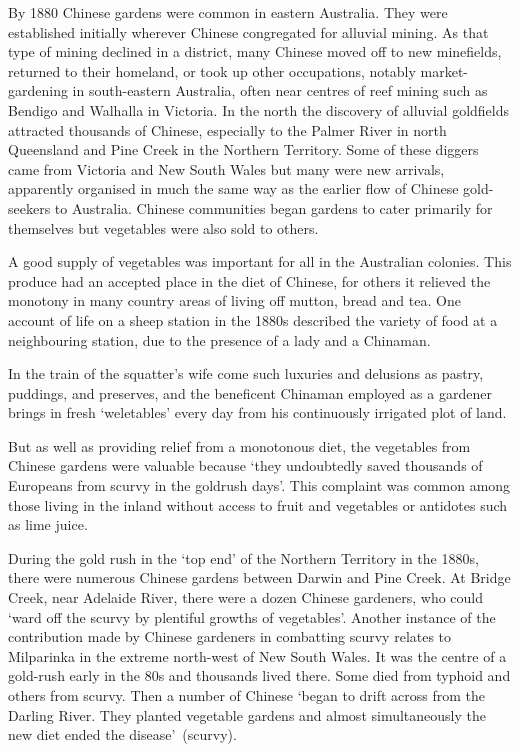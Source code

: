 By 1880 Chinese gardens were common in eastern Australia.  They were
established initially wherever Chinese congregated for alluvial
mining.  As that type of mining declined in a
district, many Chinese moved off to new minefields, returned to their
homeland, or took up other occupations, notably market-gardening in
south-eastern Austra\-lia, often near centres of reef mining
 such as Bendigo  and Walhalla
 in Victoria.  In the north the discovery of
alluvial goldfields attracted thousands of Chinese, especially to the
Palmer River in  north Queensland
 and Pine Creek  in the Northern
Territory.   Some of these diggers came from
Victoria and New South Wales but many were new arrivals, apparently
organised in much the same way as the earlier flow of Chinese
gold-seekers to Australia.  Chinese communities began gardens to cater
primarily for themselves but vegetables were also sold to others.

A good supply of vegetables was important for all in the Australian
colonies.  This produce had an accepted place in the diet of Chinese,
for others it relieved the monotony in many country areas of living
off mutton, bread and tea.  One account of life on a sheep station in
the 1880s described the variety of food at a neighbouring station, due
to the presence of a lady and a Chinaman.
\begin{Quote}
	In the train of the squatter's wife come such luxuries and
	delusions as pastry, puddings, and preserves, and the
	beneficent Chinaman employed as a gardener brings in fresh
	`weletables' every day from his continuously irrigated plot of
	land.
\end{Quote}
But as well as providing relief from a monotonous diet, the vegetables
from Chinese gardens were valuable because `they undoubtedly saved
thousands of Europeans from scurvy in the goldrush
days'.  This complaint was common among those
living in the inland without access to fruit and vegetables or
antidotes such as lime juice.

During the gold rush in the `top end' of the Northern Territory
 in the 1880s, there were numerous Chinese
 gardens between Darwin  and Pine
Creek.  At Bridge Creek,  near
Adelaide River,  there were a dozen Chinese
gardeners, who could `ward off the scurvy by plentiful growths of
vegetables'.  Another instance of the contribution made by Chinese
gardeners in combatting scurvy relates to
Milparinka  in the extreme north-west of New
South Wales.  It was the centre of a gold-rush early in the 80s and
thousands lived there.  Some died from typhoid
and others from scurvy.  Then a number of Chinese `began to drift
across from the Darling River. They planted vegetable gardens and
almost simultaneously the new diet ended the
disease'~(scurvy).

